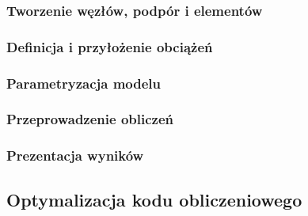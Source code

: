 \subsubsection{Tworzenie węzłów, podpór i elementów}
\subsubsection{Definicja i przyłożenie obciążeń}
\subsubsection{Parametryzacja modelu}
\subsubsection{Przeprowadzenie obliczeń}
\subsubsection{Prezentacja wyników}

\subsection{Optymalizacja kodu obliczeniowego}

